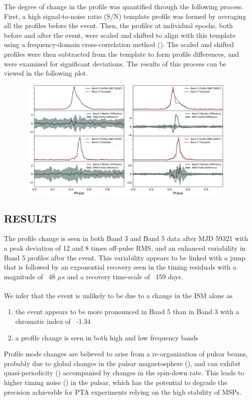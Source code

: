 \documentclass{article}
\begin{document}
The degree of change in the profile was quantified through the following process. First, a high signal-to-noise ratio (S/N) template profile was formed by averaging all the profiles before the event. Then, the profiles at individual epochs, both before and after the event, were scaled and shifted to align with this template using a frequency-domain cross-correlation method (\cite{Taylor1992}). The scaled and shifted profiles were then subtracted from the template to form profile differences, and were examined for significant deviations. The results of this process can be viewed in the following plot. 
\begin{center}
\includegraphics[height=6cm,width=14cm]{Images/V2_5.png}\\
\end{center}
\newpage
\subsection{RESULTS}
The profile change is seen in both Band 3 and Band 5 data after MJD 59321 with a peak deviation of 12 and 8 times off-pulse RMS, and an enhanced variability in Band 5 profiles after the event. This variability appears to be linked with a jump that is followed by an exponential recovery seen in the timing residuals with a magnitude of ~48 $\mu s$ and a recovery time-scale of ~159 days. \\\\
We infer that the event is unlikely to be due to a change in the ISM alone as 
\begin{enumerate}
    \item the event appears to be more pronounced in Band 5 than in Band 3 with a chromatic index of ~-1.34
    \item  a profile change is seen in both high and low frequency bands
\end{enumerate} 
Profile mode changes are believed to arise from a re-organization of pulsar beams, probably due to global changes in the pulsar magnetosphere (\cite{Timokhin2010}), and can exhibit quasi-periodicity (\cite{Lyne+2010}) accompanied by changes in the spin-down rate. This leads to higher timing noise (\cite{arun2017}) in the pulsar, which has the potential to degrade the precision achievable for PTA experiments relying on the high stability of MSPs.\\\\
\newpage
\end{document}
